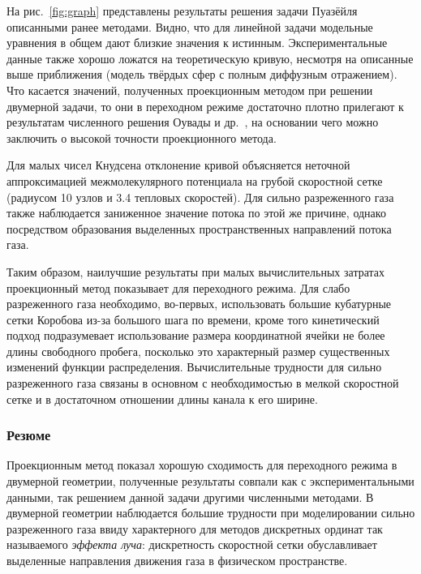 На рис.~\ref{fig:graph} представлены результаты решения задачи Пуазёйля описанными ранее методами.
Видно, что для линейной задачи модельные уравнения в общем дают близкие значения к истинным.
Экспериментальные данные также хорошо ложатся на теоретическую кривую,
несмотря на описанные выше приближения (модель твёрдых сфер с полным диффузным отражением).
Что касается значений, полученных проекционным методом при решении двумерной задачи,
то они в переходном режиме достаточно плотно прилегают к результатам численного решения Оувады и др.~\cite{Ohwada1989b},
на основании чего можно заключить о высокой точности проекционного метода.

Для малых чисел Кнудсена отклонение кривой объясняется неточной аппроксимацией межмолекулярного потенциала
на грубой скоростной сетке (радиусом 10 узлов и 3.4 тепловых скоростей).
Для сильно разреженного газа также наблюдается заниженное значение потока по этой же причине,
однако посредством образования выделенных пространственных направлений потока газа.

Таким образом, наилучшие результаты при малых вычислительных затратах проекционный метод показывает для переходного режима.
Для слабо разреженного газа необходимо, во-первых, использовать большие кубатурные сетки Коробова из-за большого шага по времени,
кроме того кинетический подход подразумевает использование размера координатной ячейки не более длины свободного пробега,
посколько это характерный размер существенных изменений функции распределения.
Вычислительные трудности для сильно разреженного газа связаны в основном с необходимостью в мелкой скоростной сетке
и в достаточном отношении длины канала к его ширине.

\subsubsection{Резюме}

Проекционным метод показал хорошую сходимость для переходного режима в двумерной геометрии,
полученные результаты совпали как с экспериментальными данными, так решением данной задачи другими численными методами.
В двумерной геометрии наблюдается б\textit{о}льшие трудности при моделировании сильно разреженного газа
ввиду характерного для методов дискретных ординат так называемого \textit{эффекта луча}:
дискретность скоростной сетки обуславливает выделенные направления движения газа в физическом пространстве.
